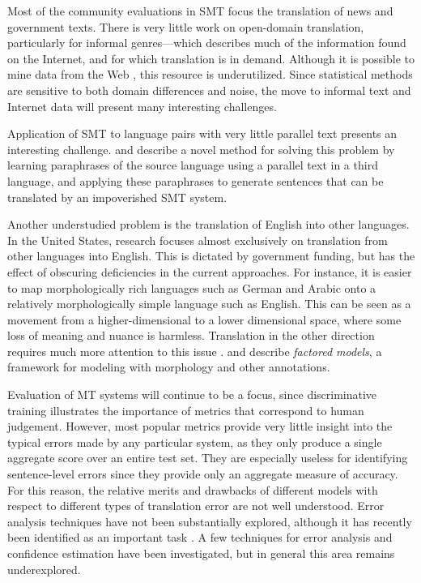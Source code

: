 Most of the community evaluations in SMT focus
the translation of news and government texts.  There is very
little work on open-domain translation,
particularly for informal genres---which describes much of the
information found on the Internet, and for which translation
is in demand.  Although it is possible to mine data from
the Web \citep{Resnik:2003:cl}, this resource is
underutilized.  Since statistical methods are
sensitive to both domain differences and noise, the move
to informal text and Internet data will present many interesting
challenges.

Application of SMT to language pairs with very little
parallel text presents an interesting challenge.  \citet{Banard:2005:acl}
and \citet{Callison-Burch:2006:hlt-naacl} describe a novel
method for solving this problem by learning paraphrases of the
source language using a parallel text in a third language, and
applying these paraphrases to generate sentences that can be
translated by an impoverished SMT system.

Another understudied problem is the
translation of English into other languages.  In the United States, research focuses almost exclusively
on translation from other languages into English.  This
is dictated by government funding, but has the effect
of obscuring deficiencies in the current
approaches.  For instance, it is easier to map morphologically
rich languages such as German and Arabic onto a relatively
morphologically simple language such as English.  This can
be seen as a movement from a higher-dimensional to a lower 
dimensional space, where some loss of meaning and nuance is harmless.
Translation in the other direction requires
much more attention to this issue
\citep{Niessen:2004:cl,Goldwater:2005:hlt-emnlp,Schafer:2005:wpt,Minkov:2007:acl}.
\citet{Koehn:2007:emnlp} and \citet{Koehn:2007:acl-demo} 
describe {\em factored models}, a
framework for modeling with morphology and other annotations.

Evaluation of MT systems will continue to 
be a focus, since discriminative training
illustrates the importance of metrics
that correspond to human judgement.   However,
most popular metrics provide very little insight
into the typical errors made by any particular system, as they
only produce a single aggregate score over an entire test set. 
They are especially useless for identifying sentence-level errors 
since they provide only an aggregate measure of accuracy.  For this
reason, the relative merits and drawbacks of different
models with respect to different types of translation error 
are not well understood.  Error analysis techniques have not
been substantially explored, although it has recently
been identified as an important task \citep{Och:2005:wpt}.
A few techniques for error analysis \citep{Deneefe:2005:acl,Chiang:2005:hlt,Popovic:2006:smt}
and confidence estimation \citep{Ueffing:2005:hlt} have been investigated, 
but in general this area remains underexplored.

